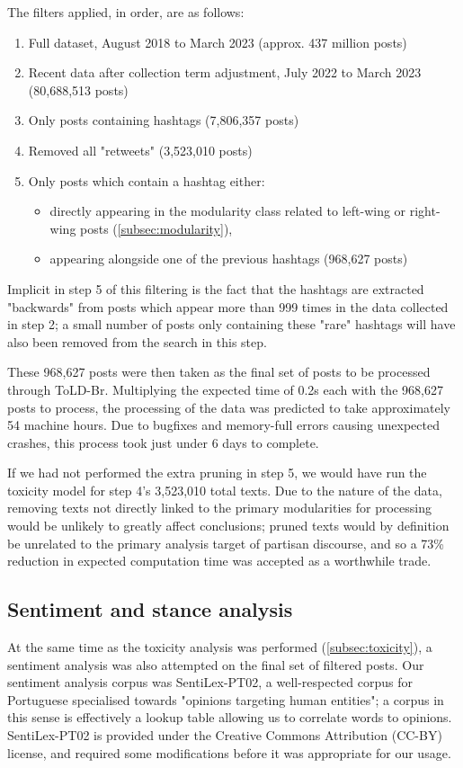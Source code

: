 \documentclass[a4paper,11pt]{article}  %
\begin{document}
	The filters applied, in order, are as follows:
	\begin{enumerate}
		\item Full dataset, August 2018 to March 2023 (approx. 437 million posts)
		\item Recent data after collection term adjustment, July 2022 to March 2023 (80,688,513 posts)
		\item Only posts containing hashtags (7,806,357 posts)
		\item Removed all "retweets" (3,523,010 posts)
		\item Only posts which contain a hashtag either:
		\begin{itemize}
			\item directly appearing in the modularity class related to left-wing or right-wing posts (\autoref{subsec:modularity}),
			\item appearing alongside one of the previous hashtags (968,627 posts)
		\end{itemize}
	\end{enumerate}
	Implicit in step 5 of this filtering is the fact that the hashtags are extracted "backwards" from posts which appear more than 999 times in the data collected in step 2; a small number of posts only containing these "rare" hashtags will have also been removed from the search in this step.
	
	These 968,627 posts were then taken as the final set of posts to be processed through ToLD-Br. Multiplying the expected time of 0.2s each with the 968,627 posts to process, the processing of the data was predicted to take approximately 54 machine hours. Due to bugfixes and memory-full errors causing unexpected crashes, this process took just under 6 days to complete.
	
	If we had not performed the extra pruning in step 5, we would have run the toxicity model for step 4's 3,523,010 total texts. Due to the nature of the data, removing texts not directly linked to the primary modularities for processing would be unlikely to greatly affect conclusions; pruned texts would by definition be unrelated to the primary analysis target of partisan discourse, and so a 73\% reduction in expected computation time was accepted as a worthwhile trade.

	\subsection{Sentiment and stance analysis}
	\label{subsec:sentiment}
	At the same time as the toxicity analysis was performed (\autoref{subsec:toxicity}), a sentiment analysis was also attempted on the final set of filtered posts. Our sentiment analysis corpus was SentiLex-PT02, a well-respected corpus for Portuguese specialised towards "opinions targeting human entities"\parencite{carvalhoSentiLexPT021970}; a corpus in this sense is effectively a lookup table allowing us to correlate words to opinions. SentiLex-PT02 is provided under the Creative Commons Attribution (CC-BY) license, and required some modifications before it was appropriate for our usage.
\end{document}
